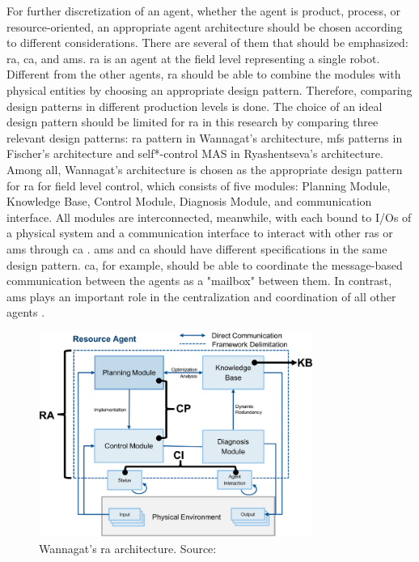 For further discretization of an agent, whether the agent is product, 
process, or resource-oriented, an appropriate agent architecture should 
be chosen according to different considerations. There are several of 
them that should be emphasized: \gls{ra}, \gls{ca}, and \gls{ams}. 
\gls{ra} is an agent at the field level representing a single robot. 
Different from the other agents, \gls{ra} should be able to combine 
the modules with physical entities by choosing an appropriate design 
pattern. Therefore, comparing design patterns in different production 
levels is done\cite{ocker_leveraging_2021}. The choice of an ideal 
design pattern should be limited for \gls{ra} in this research by 
comparing three relevant design patterns:  \gls{ra} pattern in Wannagat’s 
architecture, \gls{mfs} patterns in Fischer’s architecture and 
self*-control 
MAS in Ryashentseva’s architecture. Among all,  Wannagat’s architecture\cite{cruz_salazar_cyber-physical_2019} 
is chosen as the appropriate design pattern for \gls{ra} for field level 
control, which consists of five modules: Planning Module, Knowledge Base, 
Control Module, Diagnosis Module, and communication interface. 
All modules are interconnected, meanwhile, with each bound to 
I/Os of a physical system and a communication interface to interact 
with other \gls{ras} or \gls{ams} through \gls{ca} \cite{cruz_salazar_cyber-physical_2019}. 
\gls{ams} and \gls{ca} should have different specifications in the 
same design pattern. \gls{ca}, for example, should be able to coordinate 
the message-based communication between the agents as a "mailbox" 
between them. In contrast, \gls{ams} plays an important role in the 
centralization and coordination of all other agents \cite{wannagat_entwicklung_2010}. 
\begin{figure}[htb]
    \centering
    \includegraphics[width=0.8\textwidth]{figures/State-of-the-art/Wannagats-RA-pattern.png}

    \caption{Wannagat's \gls{ra} architecture.
    Source: \cite[fig.1]{cruz_salazar_cyber-physical_2019}\label{fig: Wannagat RA}}
\end{figure}



